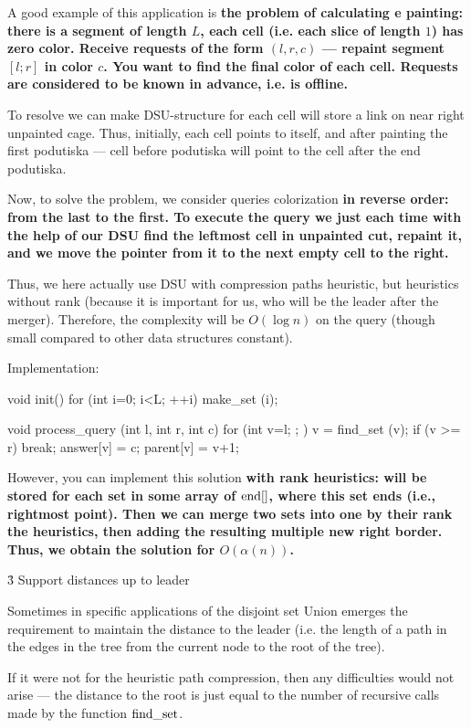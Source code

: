A good example of this application is \bf{the problem of calculating e painting}: there is a segment of length $L$, each cell (i.e. each slice of length $1$) has zero color. Receive requests of the form $(l,r,c)$ --- repaint segment $[l;r]$ in color $c$. You want to find the final color of each cell. Requests are considered to be known in advance, i.e. is offline.

To resolve we can make DSU-structure for each cell will store a link on near right unpainted cage. Thus, initially, each cell points to itself, and after painting the first podutiska --- cell before podutiska will point to the cell after the end podutiska.

Now, to solve the problem, we consider queries colorization \bf{in reverse order}: from the last to the first. To execute the query we just each time with the help of our DSU find the leftmost cell in unpainted cut, repaint it, and we move the pointer from it to the next empty cell to the right.

Thus, we here actually use DSU with compression paths heuristic, but heuristics without rank (because it is important for us, who will be the leader after the merger). Therefore, the complexity will be $O(\log n)$ on the query (though small compared to other data structures constant).

Implementation:

\code
void init() {
for (int i=0; i<L; ++i)
make_set (i);
}

void process_query (int l, int r, int c) {
for (int v=l; ; ) {
v = find_set (v);
if (v >= r) break;
answer[v] = c;
parent[v] = v+1;
}
}
\endcode

However, you can implement this solution \bf{with rank heuristics}: will be stored for each set in some array of ${\rm end}[]$, where this set ends (i.e., rightmost point). Then we can merge two sets into one by their rank the heuristics, then adding the resulting multiple new right border. Thus, we obtain the solution for $O(\alpha(n))$.



\h3{ Support distances up to leader }

Sometimes in specific applications of the disjoint set Union emerges the requirement to maintain the distance to the leader (i.e. the length of a path in the edges in the tree from the current node to the root of the tree).

If it were not for the heuristic path compression, then any difficulties would not arise --- the distance to the root is just equal to the number of recursive calls made by the function $\rm find\_set$.

